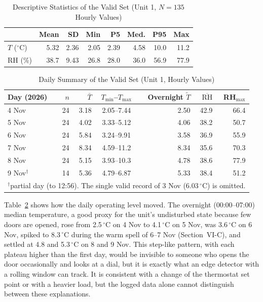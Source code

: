 \documentclass[conference]{IEEEtran}
\newcommand{\degC}{\ensuremath{^{\circ}}C}
\begin{document}
\begin{table}[t]
\caption{Descriptive Statistics of the Valid Set (Unit 1, $N = 135$ Hourly Values)}
\label{tab:desc}
\centering
\footnotesize
\begin{tabular}{lrrrrrrr}
\toprule
 & Mean & SD & Min & P5 & Med. & P95 & Max \\
\midrule
$T$ (\degC) & 5.32 & 2.36 & 2.05 & 2.39 & 4.58 & 10.0 & 11.2 \\
RH (\%) & 38.7 & 9.43 & 26.8 & 28.0 & 36.0 & 56.9 & 77.9 \\
\bottomrule
\end{tabular}
\end{table}

\begin{table}[t]
\caption{Daily Summary of the Valid Set (Unit 1, Hourly Values)}
\label{tab:daily}
\centering
\footnotesize
\setlength{\tabcolsep}{3pt}
\begin{tabular}{lrrcrrr}
\toprule
Day (2026) & $n$ & $\bar T$ & $T_{\min}$--$T_{\max}$ & Overnight $\tilde T$ & $\overline{\mathrm{RH}}$ & RH$_{\max}$ \\
\midrule
4 Nov & 24 & 3.18 & 2.05--7.44 & 2.50 & 42.9 & 66.4 \\
5 Nov & 24 & 4.02 & 3.33--5.12 & 4.06 & 38.2 & 50.7 \\
6 Nov & 24 & 5.84 & 3.24--9.91 & 3.58 & 36.9 & 55.9 \\
7 Nov & 24 & 8.34 & 4.59--11.2 & 8.34 & 35.6 & 70.3 \\
8 Nov & 24 & 5.15 & 3.93--10.3 & 4.78 & 38.6 & 77.9 \\
9 Nov$^\dagger$ & 14 & 5.36 & 4.79--6.87 & 5.33 & 38.4 & 51.2 \\
\bottomrule
\multicolumn{7}{l}{\scriptsize $^\dagger$partial day (to 12:56). The single valid record of 3 Nov (6.03\,\degC) is omitted.}
\end{tabular}
\end{table}

Table~\ref{tab:daily} shows how the daily operating level moved. The overnight (00:00--07:00) median temperature, a good proxy for the unit's undisturbed state because few doors are opened, rose from 2.5\,\degC{} on 4 Nov to 4.1\,\degC{} on 5 Nov, was 3.6\,\degC{} on 6 Nov, spiked to 8.3\,\degC{} during the warm spell of 6--7 Nov (Section~VI-C), and settled at 4.8 and 5.3\,\degC{} on 8 and 9 Nov. This step-like pattern, with each plateau higher than the first day, would be invisible to someone who opens the door occasionally and looks at a dial, but it is exactly what an edge detector with a rolling window can track. It is consistent with a change of the thermostat set point or with a heavier load, but the logged data alone cannot distinguish between these explanations.
\end{document}
